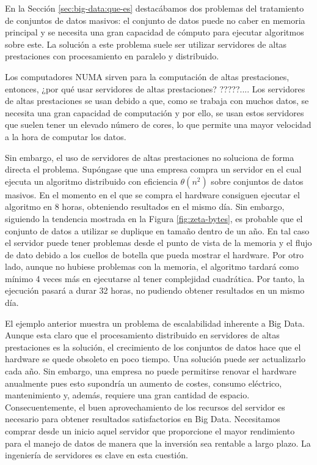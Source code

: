 \documentclass[10pt]{article}
\begin{document}
		En la Sección \ref{sec:big-data:que-es} destacábamos dos problemas del tratamiento de conjuntos de datos masivos: el conjunto de datos puede no caber en memoria principal y se necesita una gran capacidad de cómputo para ejecutar algoritmos sobre este. La solución a este problema suele ser utilizar servidores de altas prestaciones con procesamiento en paralelo y distribuido.
			
		Los computadores NUMA sirven para la computación de altas prestaciones, entonces, ¿por qué usar servidores de altas prestaciones? ?????....  Los servidores de altas prestaciones se usan debido a que, como se trabaja con muchos datos, se necesita una gran capacidad de computación y por ello, se usan estos servidores que suelen tener un elevado número de cores, lo que permite una mayor velocidad a la hora de computar los datos. 
		
		Sin embargo, el uso de servidores de altas prestaciones no soluciona de forma directa el problema. Supóngase que una empresa compra un servidor en el cual ejecuta un algoritmo distribuido con eficiencia $\theta(n^2)$ sobre conjuntos de datos masivos. En el momento en el que se compra el hardware consiguen ejecutar el algoritmo en 8 horas, obteniendo resultados en el mismo día. Sin embargo, siguiendo la tendencia mostrada en la Figura \ref{fig:zeta-bytes}, es probable que el conjunto de datos a utilizar se duplique en tamaño dentro de un año. En tal caso el servidor puede tener problemas desde el punto de vista de la memoria y el flujo de dato debido a los cuellos de botella que pueda mostrar el hardware. Por otro lado, aunque no hubiese problemas con la memoria, el algoritmo tardará como mínimo 4 veces más en ejecutarse al tener complejidad cuadrática. Por tanto, la ejecución pasará a durar 32 horas, no pudiendo obtener resultados en un mismo día. 
				
		El ejemplo anterior muestra un problema de escalabilidad inherente a Big Data. Aunque esta claro que el procesamiento distribuido en servidores de altas prestaciones es la solución, el crecimiento de los conjuntos de datos hace que el hardware se quede obsoleto en poco tiempo. Una solución puede ser actualizarlo cada año. Sin embargo, una empresa no puede permitirse renovar el hardware anualmente pues esto supondría un aumento de costes, consumo eléctrico, mantenimiento y, además, requiere una gran cantidad de espacio. Consecuentemente, el buen aprovechamiento de los recursos del servidor es necesario para obtener resultados satisfactorios en Big Data. Necesitamos comprar desde un inicio aquel servidor que proporcione el mayor rendimiento para el manejo de datos de manera que la inversión sea rentable a largo plazo. La ingeniería de servidores es clave en esta cuestión.
		
\end{document}
